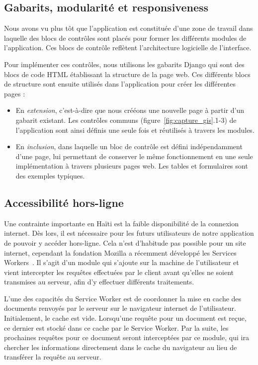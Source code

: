 \documentclass{EPL-master-thesis-covers-FR}
\begin{document}
			\subsection*{Gabarits, modularité et responsiveness}
				Nous avons vu plus tôt que l'application est constituée d'une zone de travail dans laquelle des blocs de contrôles sont placés pour former les différents modules de l'application. Ces blocs de contrôle reflètent l'architecture logicielle de l'interface.

				Pour implémenter ces contrôles, nous utilisons les gabarits Django qui sont des blocs de code HTML établissant la structure de la page web. Ces différents blocs de structure sont ensuite utilisés dans l'application pour créer les différentes pages :
				\begin{itemize}
					\item En \emph{extension}, c'est-à-dire que nous crééons une nouvelle page à partir d'un gabarit existant. Les contrôles communs (figure~\ref{fig:capture_gis}.1-3) de l'application sont ainsi définis une seule fois et réutilisés à travers les modules.
					\item En \emph{inclusion}, dans laquelle un bloc de contrôle est défini indépendamment d'une page, lui permettant de conserver le même fonctionnement en une seule implémentation à travers plusieurs pages web. Les tables et formulaires sont des exemples typiques.
				\end{itemize}

			\subsection*{Accessibilité hors-ligne}
				\label{sec:service_worker}

				Une contrainte importante en Haïti est la faible disponibilité de la connexion internet. Dès lors, il est nécessaire pour les futurs utilisateurs de notre application de pouvoir y accéder hors-ligne. Cela n'est d'habitude pas possible pour un site internet, cependant la fondation Mozilla a récemment développé les Services Workers~\cite{ref:serviceworker}. Il s'agit d'un module qui s'ajoute sur la machine de l'utilisateur et vient intercepter les requêtes effectuées par le client avant qu'elles ne soient transmises au serveur, afin d'y effectuer différents traitements.

				L'une des capacités du Service Worker est de coordonner la mise en cache des documents renvoyés par le serveur sur le navigateur internet de l'utilisateur. Initialement, le cache est vide. Lorsqu'une requête pour un document est reçue, ce dernier est stocké dans ce cache par le Service Worker. Par la suite, les prochaines requêtes pour ce document seront interceptées par ce module, qui ira chercher les informations directement dans le cache du navigateur au lieu de transférer la requête au serveur.
\end{document}
